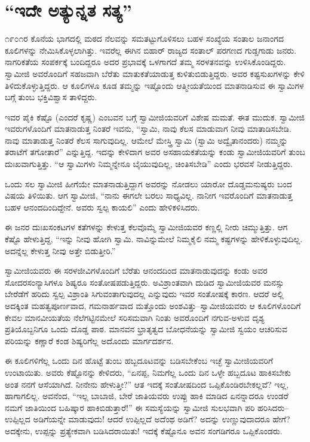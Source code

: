 
\chapter{“ಇದೇ ಅತ್ಯುನ್ನತ ಸತ್ಯ”}

\noindent

೧೯೦೧ರ ಕೊನೆಯ ಭಾಗದಲ್ಲಿ ಮಠದ ನೆಲವನ್ನು ಸಮತಟ್ಟುಗೊಳಿಸಲು ಬಹಳ ಸಂಖ್ಯೆಯ ಸಂತಾಲ ಜನಾಂಗದ ಕೂಲಿಗಳನ್ನು ನೇಮಿಸಿಕೊಳ್ಳಲಾಗಿತ್ತು. ಇವರೆಲ್ಲ ಈಗಿನ ಬಿಹಾರ್ ರಾಜ್ಯದ ಸಂತಾಲ್ ಪರಗಣದ ಗುಡ್ಡಗಾಡು ಜನರು. ನಾಗರಿಕತೆಯ ಸಂಪರ್ಕಕ್ಕೆ ಬಂದಿದ್ದರೂ ಅದರ ಪ್ರಭಾವಕ್ಕೆ ಒಳಗಾಗದೆ ತಮ್ಮ ಸರಳತನವನ್ನು ಉಳಿಸಿಕೊಂಡಿದ್ದರು. ಸ್ವಾಮೀಜಿ ಅವರೊಂದಿಗೆ ಸಹಜವಾಗಿ ಬೆರೆತು ಮಾತುಕತೆಯಾಡುತ್ತ ಕುಳಿತುಬಿಡುತ್ತಿದ್ದರು. ಅವರ ಕಷ್ಟಸುಖಗಳನ್ನು ಕೇಳಿ ತಿಳಿದುಕೊಳ್ಳುತ್ತಿದ್ದರು. ಆ ಕೂಲಿಗಳೂ ಕೂಡ ತಮ್ಮನ್ನು ಇಷ್ಟೊಂದು ಆತ್ಮೀಯತೆಯಿಂದ ಮಾತನಾಡಿಸುವ ಈ ಸ್ವಾಮಿಗಳ ಬಗ್ಗೆ ತುಂಬ ಭಕ್ತಿವಿಶ್ವಾಸ ತಾಳಿದ್ದರು.

ಇವರ ಪೈಕಿ ಕೆಷ್ಟೊ (ಎಂದರೆ ಕೃಷ್ಣ) ಎಂಬವನ ಬಗ್ಗೆ ಸ್ವಾಮೀಜಿಯವರಿಗೆ ವಿಶೇಷ ಮಮತೆ. ಈತ ಮುದುಕ. ಸ್ವಾಮೀಜಿ ಇವರುಗಳೊಂದಿಗೆ ಮಾತನಾಡುತ್ತ ನಿಂತರೆ ಇವನು, “ಸ್ವಾಮಿ, ನಾವು ಕೆಲಸ ಮಾಡುವಾಗ ನೀವು ಮಾತಾಡಿಸಬೇಡಿ. ನಾವು ಮಾತಾಡುತ್ತ ನಿಂತರೆ ಕೆಲಸ ಸಾಗುವುದಿಲ್ಲ. ಆಮೇಲೆ ಮೇಸ್ತ್ರಿ ಸ್ವಾಮಿ (ಸ್ವಾಮಿ ಅದ್ವೈತಾನಂದರು) ನಮ್ಮನ್ನು ತರಾಟೆಗೆ ತಗೋತಾರೆ” ಎನ್ನುತ್ತಿದ್ದ. ಇದನ್ನು ಕೇಳಿದಾಗ ಅವರ ಅಸಹಾಯಕತೆಯನ್ನು ಕಂಡು ಸ್ವಾಮೀಜಿಯವರಿಗೆ ತುಂಬ ದುಃಖವಾಗುತ್ತಿತ್ತು. “ಆ ಸ್ವಾಮಿಗಳು ನಿಮ್ಮನ್ನೇನೂ ಬೈಯುವುದಿಲ್ಲ, ಚಿಂತಿಸಬೇಡಿ” ಎಂದು ಭರವಸೆ ನೀಡುತ್ತಿದ್ದರು.

ಒಂದು ಸಲ ಸ್ವಾಮೀಜಿ ಹೀಗೆಯೇ ಮಾತನಾಡುತ್ತಿದ್ದಾಗ ಅವರನ್ನು ನೋಡಲು ಯಾರೋ ದೊಡ್ಡಮನುಷ್ಯರು ಬಂದ ವಿಷಯ ತಿಳಿಯಿತು. ಆಗ ಸ್ವಾಮೀಜಿ, “ನಾನು ಈಗಲೇ ಬರಲು ಸಾಧ್ಯವಿಲ್ಲ. ನಾನೀಗ ಇವರೊಂದಿಗೆ ಮಾತನಾಡುತ್ತ ಬಹಳ ಆನಂದದಿಂದಿದ್ದೇನೆ. ಅವರು ಸ್ವಲ್ಪ ಕಾಯಲಿ” ಎಂದು ಹೇಳಿಕಳಿಸಿದರು.

ಈ ಜನರ ದುಃಖಸಂಕಟಗಳ ಕತೆಗಳನ್ನು ಕೇಳುತ್ತ ಕೆಲವೊಮ್ಮೆ ಸ್ವಾಮೀಜಿಯವರ ಕಣ್ಣಲ್ಲಿ ನೀರು ಚಿಮ್ಮುತ್ತಿತ್ತು. ಆಗ ಕೆಷ್ಟೊ ಹೇಳುತ್ತಿದ್ದ, “ಇನ್ನು ನೀವು ಹೋಗಿ ಸ್ವಾಮಿ. ನಾವಿನ್ನುಮೇಲೆ ನಿಮ್ಮಕೈಲಿ ನಮ್ಮ ಕಷ್ಟಗಳನ್ನು ಹೇಳಿಕೊಳ್ಳುವುದಿಲ್ಲ. ಅದನ್ನೆಲ್ಲ ಕೇಳುತ್ತ ನೀವು ಅತ್ತೇ ಬಿಡುತ್ತೀರಿ.”

ಸ್ವಾಮೀಜಿಯವರು ಈ ಸರಳಜೀವಿಗಳೊಂದಿಗೆ ಬೆರೆತು ಆನಂದದಿಂದ ಮಾತನಾಡುವುದನ್ನು ಕಂಡು ಅವರ ಸೋದರಸಂನ್ಯಾಸಿಗಳೂ ಶಿಷ್ಯರೂ ಸಂತೋಷಪಡುತ್ತಿದ್ದರು. ಅವಿಶ್ರಾಂತವಾಗಿ ದುಡಿದ ಸ್ವಾಮೀಜಿಯವರ ಮನಸ್ಸು ಬೇರೆಡೆಗೆ ಹರಿದು ಸ್ವಲ್ಪ ವಿಶ್ರಾಂತಿ ಸಿಗುವಂತಾಗುವುದಲ್ಲ ಎನ್ನುವುದು ಇವರ ಸಂತೋಷಕ್ಕೆ ಕಾರಣ. ಆದರೆ ಅಲ್ಲಿ ಅದಕ್ಕಿಂತ ಮಹತ್ವಪೂರ್ಣವಾದ, ಗಮನಾರ್ಹವಾದ ಮತ್ತೊಂದು ಅಂಶವಿತ್ತು–ಸ್ವಾಮೀಜಿಯವರು ಆ ಕೂಲಿಗಳೊಂದಿಗೆ ಕೇವಲ ಮಾನವೀಯತೆಯ ನೆಲೆಗಟ್ಟಿನಮೇಲೆ ಸರಿಸಮವಾಗಿ ನಿಂತು ಅವರೊಂದಿಗೆ ನಗುವ-ಅಳುವ ದೃಶ್ಯ ಪ್ರತಿಯೊಬ್ಬನಿಗೂ ಒಂದು ದೊಡ್ಡ ಪಾಠ. ಮಾನವನ ಭ್ರಾತೃತ್ವದ ಬೋಧನೆಯನ್ನು ಸ್ವಾಮೀಜಿ ಸ್ವಯಂ ಆಚರಿಸುವ ಪರಿಯನ್ನು ಕಣ್ಣಾರೆ ಕಂಡ ಶಿಷ್ಯರಿಗೆಲ್ಲ ಅದೊಂದು ಮಾರ್ಗದರ್ಶನ.

ಈ ಕೂಲಿಗಳಿಗೆಲ್ಲ ಒಂದು ದಿನ ಹೊಟ್ಟೆ ತುಂಬ ಹಬ್ಬದೂಟವನ್ನು ಬಡಿಸಬೇಕೆಂಬ ಇಚ್ಛೆ ಸ್ವಾಮೀಜಿಯವರಿಗೆ ಉಂಟಾಯಿತು. ಅವರು ಕೆಷ್ಟೊನನ್ನು ಕೇಳಿದರು, “ಏನಪ್ಪ, ನಿಮಗೆಲ್ಲ ಒಂದು ದಿನ ಒಳ್ಳೇ ಹಬ್ಬದೂಟ ಹಾಕಿಸಬೇಕು ಅಂತ ನನಗೆ ಆಸೆಯಾಗಿದೆ. ನೀನೇನು ಹೇಳುತ್ತೀ?” ಆತ ಇದಕ್ಕೆ ಸಂತೋಷದಿಂದ ಒಪ್ಪಿಕೊಂಡಿರಬೇಕಲ್ಲವೆ? ಇಲ್ಲ, ಹಾಗಾಗಲಿಲ್ಲ. ಅವನೆಂದ, “ಇಲ್ಲ ಬಾಬಾಜಿ, ಬೇರೆ ಜಾತಿಯವರು ಉಪ್ಪು ಹಾಕಿ ಮಾಡಿದ ಏನನ್ನಾದರೂ ಉಂಡರೆ ನಮಗೆ ಜಾತಿಯಿಂದ ಬಹಿಷ್ಕಾರ ಹಾಕಿಬಿಡುತ್ತಾರೆ!” ಈ ಸಮಸ್ಯೆಯನ್ನು ಸ್ವಾಮೀಜಿ ಸುಲಭವಾಗಿ ಪರಿ ಹರಿಸಿದರು–ಉಪ್ಪಿಲ್ಲದ ಅಡಿಗೆಯನ್ನೇ ಮಾಡುವುದು! ಆದರೆ ಉಪ್ಪಿಲ್ಲದೆ ಅದೆಂಥ ಅಡಿಗೆ? ಅದನ್ನು ಉಣ್ಣುವುದಾದರೂ ಹೇಗೆ? ಅದಕ್ಕೇನು, ಉಪ್ಪನ್ನು ಪ್ರತ್ಯೇಕವಾಗಿ ಬಡಿಸಿದರಾಯಿತು! ಇದಕ್ಕೆ ಕೆಷ್ಟೊನೂ ಅವನ ಸಂಗಡಿಗರೂ ಒಪ್ಪಿಕೊಂಡರು.

